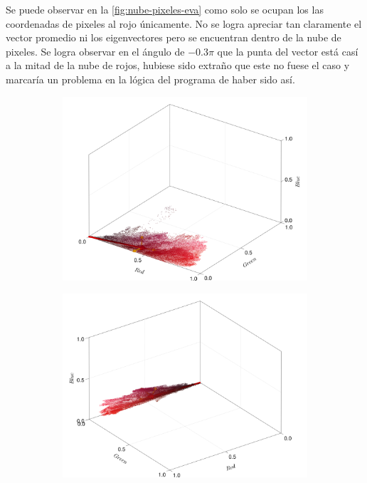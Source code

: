 Se puede observar en la \cref{fig:nube-pixeles-eva} como solo se ocupan los las coordenadas de pixeles al rojo únicamente. No se logra apreciar tan claramente el vector promedio ni los eigenvectores pero se encuentran dentro de la nube de pixeles. Se logra observar en el ángulo de $-0.3\pi$ que la punta del vector está casí a la mitad de la nube de rojos, hubiese sido extraño que este no fuese el caso y marcaría un problema en la lógica del programa de haber sido así.
\begin{figure}[ht!]
    \centering
    \begin{subfigure}[c]{0.3\textwidth}
        \centering
        \includegraphics[scale=0.09]{../figures/pixel_cloud_eva_1}
    \end{subfigure}
    \begin{subfigure}[c]{0.3\textwidth}
        \centering
        \includegraphics[scale=0.09]{../figures/pixel_cloud_eva_2}

\end{subfigure}
\end{figure}
